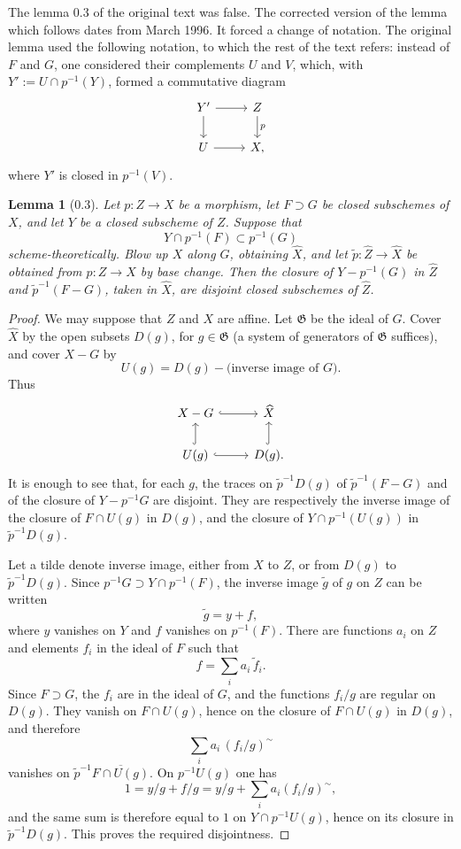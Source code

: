 \documentclass[11pt]{article}
\newtheorem*{lemma}{Lemma}
\newcommand{\cl}[1]{\overline{#1}}
\newcommand{\tw}[1]{\widetilde{#1}}
\newcommand{\wh}[1]{\widehat{#1}}
\begin{document}
The lemma 0.3 of the original text was false. The corrected version of the lemma which follows dates from March 1996. It forced a change of notation. The original lemma used the following notation, to which the rest of the text refers: instead of \(F\) and \(G\), one considered their complements \(U\) and \(V\), which, with \(Y' := U\cap p^{-1}(Y)\), formed a commutative diagram
\[
\begin{tikzcd}
Y' \ar[r] \ar[d] & Z \ar[d,"p"] \\
U \ar[r] & X,
\end{tikzcd}
\]
where \(Y'\) is closed in \(p^{-1}(V)\).

\begin{lemma}[0.3]
Let \(p:Z\to X\) be a morphism, let \(F\supset G\) be closed subschemes of \(X\), and let \(Y\) be a closed subscheme of \(Z\). Suppose that
\[
Y\cap p^{-1}(F)\subset p^{-1}(G)
\]
scheme-theoretically. Blow up \(X\) along \(G\), obtaining \(\wh X\), and let \(\tw p:\wh Z\to \wh X\) be obtained from \(p:Z\to X\) by base change. Then the closure of \(Y-p^{-1}(G)\) in \(\wh Z\) and \(\tw p^{-1}(F-G)\), taken in \(\wh X\), are disjoint closed subschemes of \(\wh Z\).
\end{lemma}

\begin{proof}
We may suppose that \(Z\) and \(X\) are affine. Let \(\mathfrak G\) be the ideal of \(G\). Cover \(\wh X\) by the open subsets \(D(g)\), for \(g\in \mathfrak G\) (a system of generators of \(\mathfrak G\) suffices), and cover \(X-G\) by
\[
U(g)=D(g)-\text{(inverse image of }G\text{)}.
\]
Thus
\[
\begin{tikzcd}
X-G \ar[r,hook] & \wh X \\
U(g) \ar[u,hook] \ar[r,hook] & D(g). \ar[u,hook]
\end{tikzcd}
\]
It is enough to see that, for each \(g\), the traces on \(\tw p^{-1}D(g)\) of \(\tw p^{-1}(F-G)\) and of the closure of \(Y-p^{-1}G\) are disjoint. They are respectively the inverse image of the closure of \(F\cap U(g)\) in \(D(g)\), and the closure of \(Y\cap p^{-1}(U(g))\) in \(\tw p^{-1}D(g)\).

Let a tilde denote inverse image, either from \(X\) to \(Z\), or from \(D(g)\) to \(\tw p^{-1}D(g)\). Since \(p^{-1}G\supset Y\cap p^{-1}(F)\), the inverse image \(\tw g\) of \(g\) on \(Z\) can be written
\[
\tw g=y+f,
\]
where \(y\) vanishes on \(Y\) and \(f\) vanishes on \(p^{-1}(F)\). There are functions \(a_i\) on \(Z\) and elements \(f_i\) in the ideal of \(F\) such that
\[
f=\sum_i a_i\,\tw f_i.
\]
Since \(F\supset G\), the \(f_i\) are in the ideal of \(G\), and the functions \(f_i/g\) are regular on \(D(g)\). They vanish on \(F\cap U(g)\), hence on the closure of \(F\cap U(g)\) in \(D(g)\), and therefore
\[
\sum_i a_i\,(f_i/g)^{\sim}
\]
vanishes on \(\tw p^{-1}\cl{F\cap U(g)}\). On \(p^{-1}U(g)\) one has
\[
1=y/g+f/g=y/g+\sum_i a_i(f_i/g)^{\sim},
\]
and the same sum is therefore equal to \(1\) on \(Y\cap p^{-1}U(g)\), hence on its closure in \(\tw p^{-1}D(g)\). This proves the required disjointness.
\end{proof}
\end{document}
